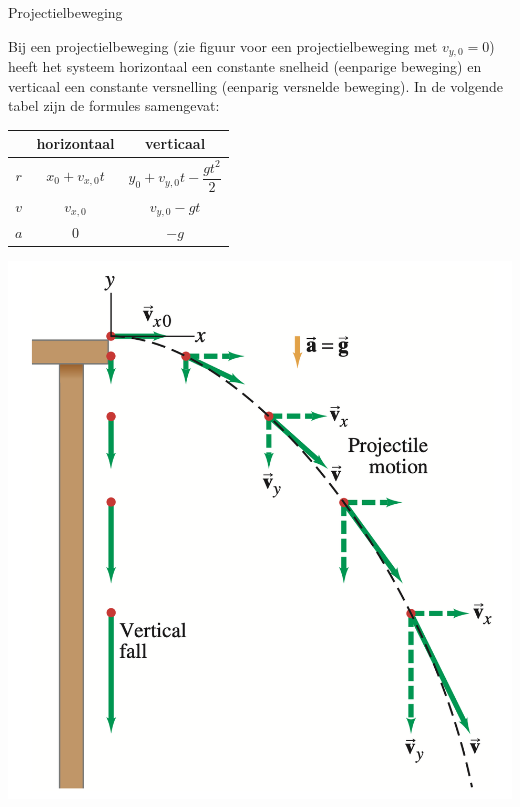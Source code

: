 \begin{app}[Projectielbeweging]{Projectielbeweging}

    Bij een projectielbeweging (zie figuur voor een projectielbeweging met $ v_{y,0} = 0 $) heeft het systeem horizontaal een constante snelheid (eenparige beweging) en verticaal een constante versnelling (eenparig versnelde beweging). In de volgende tabel zijn de formules samengevat: 
            
    \begin{minipage}{.43\textwidth}
    
        \def\arraystretch{2.5}
        \hspace{2cm}\begin{tabular}{c|c|c}
             & horizontaal & verticaal \\ \hline
             $ r $ & $ x_0 + v_{x,0}t $ & $ y_0 + v_{y,0}t - \dfrac{gt^2}{2} $ \\ \hline
             $ v $ & $ v_{x,0} $ & $ v_{y,0} - gt $  \\ \hline
             $ a $ & $ 0 $ & $ -g $ 
        \end{tabular}
        
    \end{minipage} 
    \begin{minipage}{.43\textwidth}
        \hspace{3cm}\includegraphics[scale = 0.25]{Images/Kinematica/Projectielbeweging.png}
    \end{minipage}
        

\end{app}
